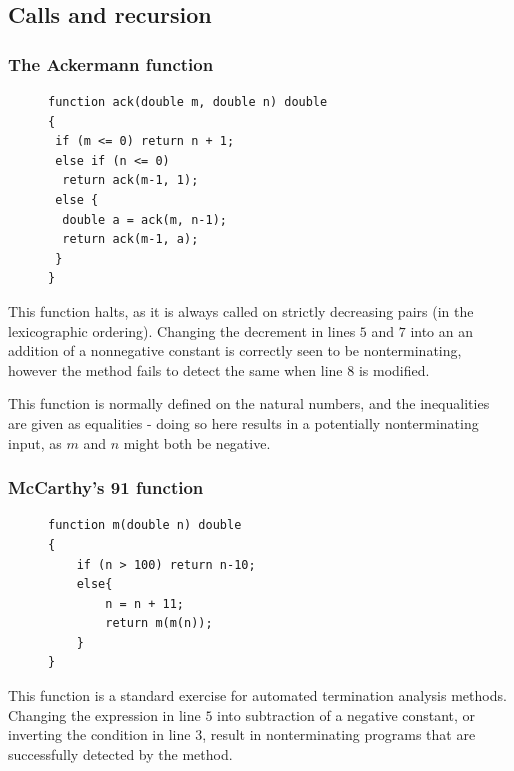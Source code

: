\documentclass[12pt,a4paper]{article}
\begin{document}
\subsection{Calls and recursion}
\subsubsection{The Ackermann function}\label{example:ack}
\begin{figure}
\centering
\begin{lstlisting}[frame=tlrb,language=myLang]
function ack(double m, double n) double
{
 if (m <= 0) return n + 1;
 else if (n <= 0) 
  return ack(m-1, 1);
 else {
  double a = ack(m, n-1);
  return ack(m-1, a);
 }
}
\end{lstlisting}
\end{figure}
This function halts, as it is always called on strictly decreasing pairs (in the lexicographic ordering).
Changing the decrement in lines $5$ and $7$ into an an addition of a nonnegative constant is correctly seen to be nonterminating,
however the method fails to detect the same when line $8$ is modified.

This function is normally defined on the natural numbers, and the inequalities are given as equalities - doing so here results in a potentially
nonterminating input, as $m$ and $n$ might both be negative.

\subsubsection{McCarthy's 91 function}
\begin{figure}
\centering
\begin{lstlisting}[frame=tlrb,language=myLang]
function m(double n) double
{
    if (n > 100) return n-10;
    else{
        n = n + 11;
        return m(m(n));
    }
}
\end{lstlisting}
\end{figure}
This function is a standard exercise for automated termination analysis methods. Changing the expression in line $5$ into subtraction of a negative constant,
or inverting the condition in line $3$, result in nonterminating programs that are successfully detected by the method.
\vspace{.8cm}
\end{document}
